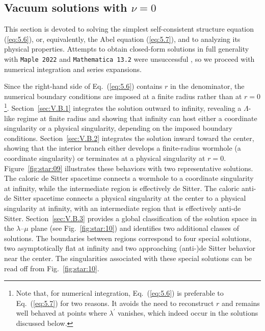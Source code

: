 \documentclass[aps,prd,twocolumn]{revtex4-2}
\begin{document}
\subsection{Vacuum solutions with $\nu=0$}\label{sec:V.B}
This section is devoted to solving the simplest self-consistent structure equation (\ref{eq:5.6}), or, equivalently, the Abel equation (\ref{eq:5.7}), and to analyzing its physical properties. Attempts to obtain closed-form solutions in full generality with \texttt{Maple 2022} and \texttt{Mathematica 13.2} were unsuccessful \cite{NotShown}, so we proceed with numerical integration and series expansions.

Since the right-hand side of Eq.~(\ref{eq:5.6}) contains $r$ in the denominator, the numerical boundary conditions are imposed at a finite radius rather than at $r=0$ \footnote{Note that, for numerical integration, Eq.~(\ref{eq:5.6}) is preferable to Eq.~(\ref{eq:5.7}) for two reasons. It avoids the need to reconstruct $r$ and remains well behaved at points where $\lambda^\prime$ vanishes, which indeed occur in the solutions discussed below.}. Section~\ref{sec:V.B.1} integrates the solution outward to infinity, revealing a $\Lambda$-like regime at finite radius and showing that infinity can host either a coordinate singularity or a physical singularity, depending on the imposed boundary conditions. Section~\ref{sec:V.B.2} integrates the solution inward toward the center, showing that the interior branch either develops a finite-radius wormhole (a coordinate singularity) or terminates at a physical singularity at $r=0$. Figure~\ref{fig:star:09} illustrates these behaviors with two representative solutions. The caloric de Sitter spacetime connects a wormhole to a coordinate singularity at infinity, while the intermediate region is effectively de Sitter. The caloric anti-de Sitter spacetime connects a physical singularity at the center to a physical singularity at infinity, with an intermediate region that is effectively anti-de Sitter. Section~\ref{sec:V.B.3} provides a global classification of the solution space in the $\lambda$--$\mu$ plane (see Fig.~\ref{fig:star:10}) and identifies two additional classes of solutions. The boundaries between regions correspond to four special solutions, two asymptotically flat at infinity and two approaching (anti-)de Sitter behavior near the center. The singularities associated with these special solutions can be read off from Fig.~\ref{fig:star:10}.
\end{document}
